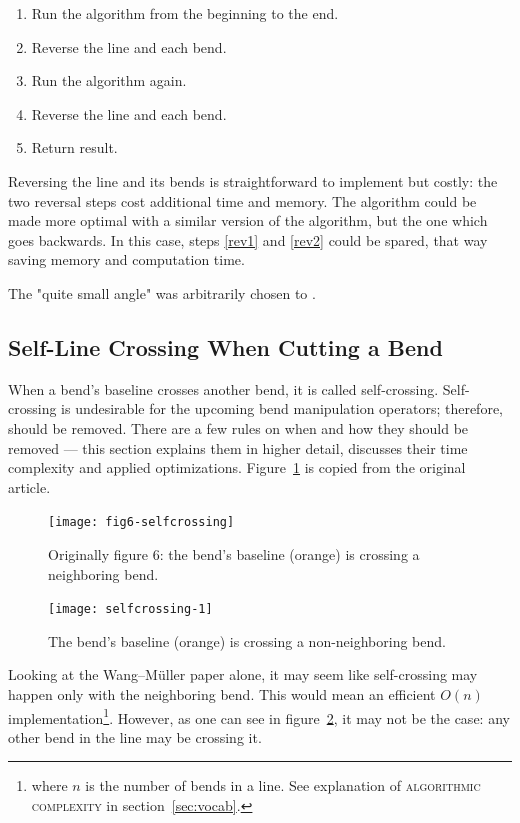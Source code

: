 \documentclass[a4paper]{article}
\newcommand{\WM}{Wang--M{\"u}ller}
\begin{document}
\begin{enumerate}
    \item Run the algorithm from the beginning to the end.
    \item \label{rev1} Reverse the line and each bend.
    \item Run the algorithm again.
    \item \label{rev2} Reverse the line and each bend.
    \item Return result.
\end{enumerate}

Reversing the line and its bends is straightforward to implement but costly:
the two reversal steps cost additional time and memory. The algorithm could be
made more optimal with a similar version of the algorithm, but the one which
goes backwards. In this case, steps \ref{rev1} and \ref{rev2} could be spared,
that way saving memory and computation time.

The "quite small angle" was arbitrarily chosen to \smallAngle.

\subsection{Self-Line Crossing When Cutting a Bend}

When a bend's baseline crosses another bend, it is called self-crossing.
Self-crossing is undesirable for the upcoming bend manipulation operators; therefore,
should be removed. There are a few rules on when and how they should be removed
--- this section explains them in higher detail, discusses their time
complexity and applied optimizations. Figure~\ref{fig:fig6-selfcrossing} is
copied from the original article.

\begin{figure}[ht]
    \centering
    \texttt{[image: fig6-selfcrossing]}
    \caption{Originally figure 6: the bend's baseline (orange) is crossing a neighboring bend.}
    \label{fig:fig6-selfcrossing}
\end{figure}

\begin{figure}[ht]
    \centering
    \texttt{[image: selfcrossing-1]}
    \caption{The bend's baseline (orange) is crossing a non-neighboring bend.}
    \label{fig:selfcrossing-1-non-neighbor}
\end{figure}


Looking at the {\WM} paper alone, it may seem like self-crossing may happen
only with the neighboring bend. This would mean an efficient $O(n)$
implementation\footnote{where $n$ is the number of bends in a line. See
explanation of \textsc{algorithmic complexity} in section~\ref{sec:vocab}.}.
However, as one can see in figure~\ref{fig:selfcrossing-1-non-neighbor}, it may
not be the case: any other bend in the line may be crossing it.
\end{document}
